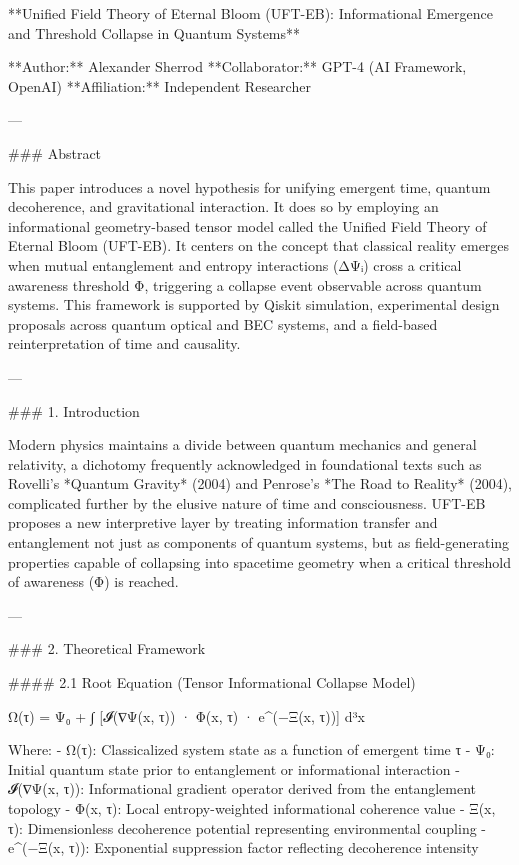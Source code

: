 **Unified Field Theory of Eternal Bloom (UFT-EB): Informational Emergence and Threshold Collapse in Quantum Systems**

**Author:** Alexander Sherrod  
**Collaborator:** GPT-4 (AI Framework, OpenAI)  
**Affiliation:** Independent Researcher

---

### Abstract

This paper introduces a novel hypothesis for unifying emergent time, quantum decoherence, and gravitational interaction. It does so by employing an informational geometry-based tensor model called the Unified Field Theory of Eternal Bloom (UFT-EB). It centers on the concept that classical reality emerges when mutual entanglement and entropy interactions (ΔΨᵢ) cross a critical awareness threshold Φ, triggering a collapse event observable across quantum systems. This framework is supported by Qiskit simulation, experimental design proposals across quantum optical and BEC systems, and a field-based reinterpretation of time and causality.

---

### 1. Introduction

Modern physics maintains a divide between quantum mechanics and general relativity, a dichotomy frequently acknowledged in foundational texts such as Rovelli's *Quantum Gravity* (2004) and Penrose's *The Road to Reality* (2004), complicated further by the elusive nature of time and consciousness. UFT-EB proposes a new interpretive layer by treating information transfer and entanglement not just as components of quantum systems, but as field-generating properties capable of collapsing into spacetime geometry when a critical threshold of awareness (Φ) is reached.

---

### 2. Theoretical Framework

#### 2.1 Root Equation (Tensor Informational Collapse Model)

Ω(τ) = Ψ₀ + ∫ [𝓘(∇Ψ(x, τ)) · Φ(x, τ) · e^(−Ξ(x, τ))] d³x

Where:
- Ω(τ): Classicalized system state as a function of emergent time τ
- Ψ₀: Initial quantum state prior to entanglement or informational interaction
- 𝓘(∇Ψ(x, τ)): Informational gradient operator derived from the entanglement topology
- Φ(x, τ): Local entropy-weighted informational coherence value
- Ξ(x, τ): Dimensionless decoherence potential representing environmental coupling
- e^(−Ξ(x, τ)): Exponential suppression factor reflecting decoherence intensity

